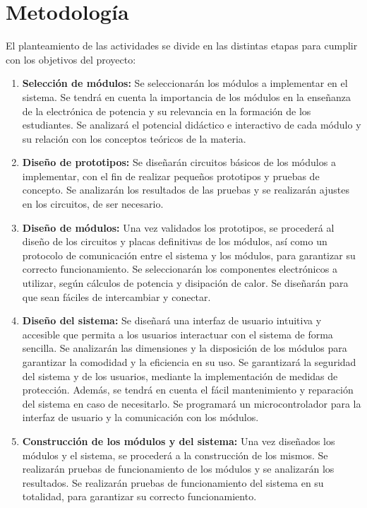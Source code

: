 \section*{Metodología}
\justifying

El planteamiento de las actividades se divide en las distintas etapas para cumplir
con los objetivos del proyecto:

\begin{enumerate}[noitemsep]
    \item \textbf{Selección de módulos:} Se seleccionarán los módulos a implementar
    en el sistema. Se tendrá en cuenta la importancia de los módulos en la enseñanza de la electrónica
    de potencia y su relevancia en la formación de los estudiantes. Se analizará el potencial
    didáctico e interactivo de cada módulo y su relación con los conceptos teóricos de la materia.

    \item \textbf{Diseño de prototipos:} Se diseñarán circuitos básicos de los módulos a implementar,
    con el fin de realizar pequeños prototipos y pruebas de concepto. Se analizarán los resultados
    de las pruebas y se realizarán ajustes en los circuitos, de ser necesario.

    \item \textbf{Diseño de módulos:} Una vez validados los prototipos, se procederá al diseño de los
    circuitos y placas definitivas de los módulos, así como un protocolo de comunicación entre el
    sistema y los módulos, para garantizar su correcto funcionamiento. Se seleccionarán los
    componentes electrónicos a utilizar, según cálculos de potencia y disipación de calor.
    Se diseñarán para que sean fáciles de intercambiar y conectar.
    
    \item \textbf{Diseño del sistema:} Se diseñará una interfaz de usuario intuitiva y accesible
    que permita a los usuarios interactuar con el sistema de forma sencilla. Se analizarán las dimensiones
    y la disposición de los módulos para garantizar la comodidad y la eficiencia en su uso. Se garantizará
    la seguridad del sistema y de los usuarios, mediante la implementación de medidas de protección.
    Además, se tendrá en cuenta el fácil mantenimiento y reparación del sistema en caso de necesitarlo.
    Se programará un microcontrolador para la interfaz de usuario y la comunicación con los módulos.
    
    \item \textbf{Construcción de los módulos y del sistema:} Una vez diseñados los módulos y el sistema,
    se procederá a la construcción de los mismos. Se realizarán pruebas de funcionamiento
    de los módulos y se analizarán los resultados. Se realizarán pruebas de funcionamiento del sistema
    en su totalidad, para garantizar su correcto funcionamiento.
    

\end{enumerate}
